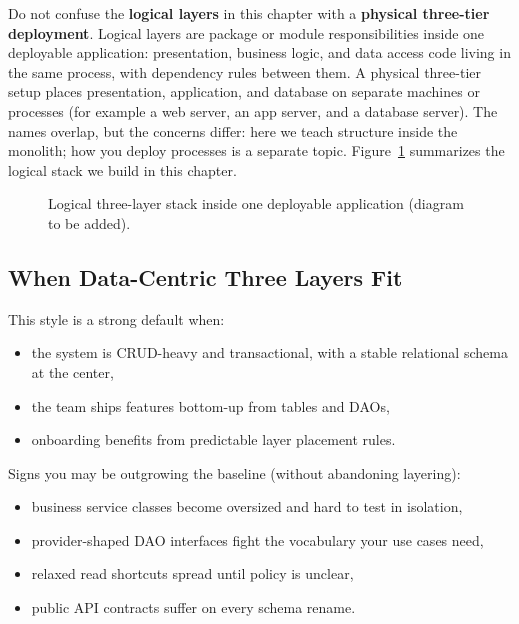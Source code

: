 Do not confuse the \textbf{logical layers} in this chapter with a \textbf{physical three-tier deployment}. Logical layers are package or module responsibilities inside one deployable application: presentation, business logic, and data access code living in the same process, with dependency rules between them. A physical three-tier setup places presentation, application, and database on separate machines or processes (for example a web server, an app server, and a database server). The names overlap, but the concerns differ: here we teach structure inside the monolith; how you deploy processes is a separate topic. Figure~\ref{fig:three_layered_logical_stack} summarizes the logical stack we build in this chapter.

\begin{figure}[htbp]
\centering
{}
\caption{Logical three-layer stack inside one deployable application (diagram to be added).}
\label{fig:three_layered_logical_stack}
\end{figure}

\subsection{When Data-Centric Three Layers Fit}
\label{sec:three_layered_when_to_use}

This style is a strong default when:
\begin{itemize}
    \item the system is CRUD-heavy and transactional, with a stable relational schema at the center,
    \item the team ships features bottom-up from tables and DAOs,
    \item onboarding benefits from predictable layer placement rules.
\end{itemize}

Signs you may be outgrowing the baseline (without abandoning layering):
\begin{itemize}
    \item business service classes become oversized and hard to test in isolation,
    \item provider-shaped DAO interfaces fight the vocabulary your use cases need,
    \item relaxed read shortcuts spread until policy is unclear,
    \item public API contracts suffer on every schema rename.
\end{itemize}


